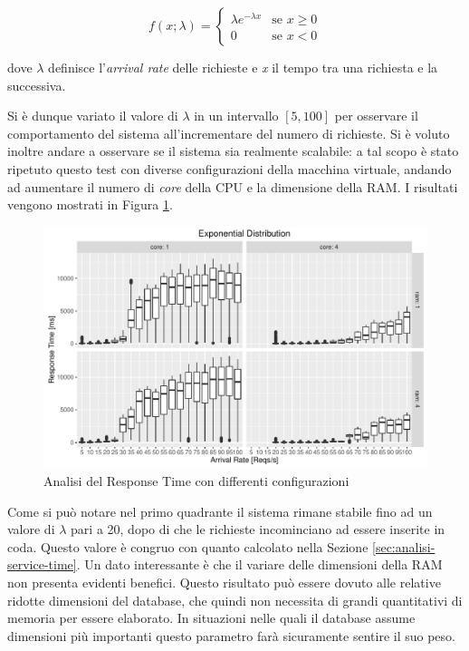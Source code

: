 \begin{equation}
	f(x;\lambda) = 
	\begin{cases}
		\lambda e^{-\lambda x} & \text{se } x \ge 0 \\
		0 & \text{se } x < 0
	\end{cases}
\end{equation}

dove $ \lambda $ definisce l'\emph{arrival rate} delle richieste e \emph{x} il tempo tra una richiesta e la successiva.

Si è dunque variato il valore di $ \lambda $ in un intervallo $ [5, 100] $ per osservare il comportamento del sistema all'incrementare del numero di richieste. Si è voluto inoltre andare a osservare se il sistema sia realmente scalabile: a tal scopo è stato ripetuto questo test con diverse configurazioni della macchina virtuale, andando ad aumentare il numero di \emph{core} della CPU e la dimensione della RAM. I risultati vengono mostrati in Figura \ref{fig:exponential-analysis}.

\begin{figure}[ht]
	\centering
	\includegraphics[width=\textwidth]{7-performance/Immagini/exponential_analysis.pdf}
	\caption{Analisi del Response Time con differenti configurazioni}\label{fig:exponential-analysis}
\end{figure}

Come si può notare nel primo quadrante il sistema rimane stabile fino ad un valore di $ \lambda $ pari a 20, dopo di che le richieste incominciano ad essere inserite in coda. Questo valore è congruo con quanto calcolato nella Sezione \ref{sec:analisi-service-time}. Un dato interessante è che il variare delle dimensioni della RAM non presenta evidenti benefici. Questo risultato può essere dovuto alle relative ridotte dimensioni del database, che quindi non necessita di grandi quantitativi di memoria per essere elaborato. In situazioni nelle quali il database assume dimensioni più importanti questo parametro farà sicuramente sentire il suo peso.

